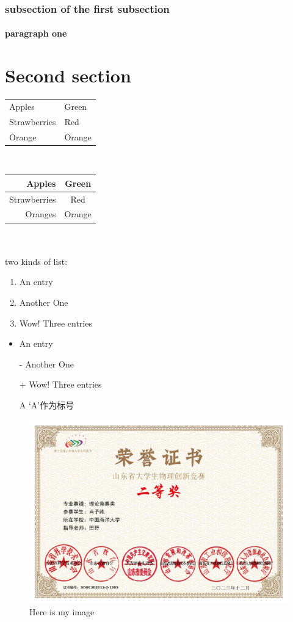 \documentclass[a4paper, 12pt]{article}
\begin{document}
	\subsubsection{subsection of the first subsection}
	\paragraph{paragraph one}
	\section{Second section}
	\begin{tabular}{|l|l|}
		Apples       & Green  \\%
		\cline{1-1}Strawberries & Red    \\
		Orange       & Orange \\
	\end{tabular}
	\\
	\begin{tabular}{rc}
		Apples              & Green  \\
		\hline  %
		Strawberries        & Red    \\
		\cline{1-2} Oranges & Orange \\ %
	\end{tabular}
	\\
	\\two kinds of list:
	\begin{enumerate}
		\item An entry
		\item Another One
		\item Wow! Three entries
	\end{enumerate}
	\begin{itemize}
		\item An entry
		\item[-] Another One
		\item[+] Wow! Three entries
		\item[A] ‘A’作为标号
	\end{itemize}
	\begin{figure}[h]
		\centering
		\includegraphics[width=1\textwidth]{image}
		\caption{Here is my image}
		\label{image-myimage}
	\end{figure}
\end{document}
